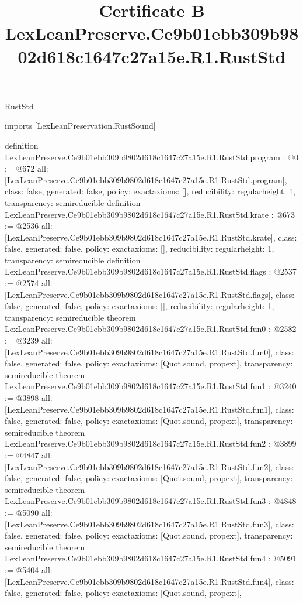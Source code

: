 \begin{lexlean}{RustStd}
\title{Certificate B LexLeanPreserve.Ce9b01ebb309b9802d618c1647c27a15e.R1.RustStd}
\begin{coremodule}
imports [LexLeanPreservation.RustSound]

definition LexLeanPreserve.Ce9b01ebb309b9802d618c1647c27a15e.R1.RustStd.program : @0 := @672 {
  all: [LexLeanPreserve.Ce9b01ebb309b9802d618c1647c27a15e.R1.RustStd.program],
  class: false,
  generated: false,
  policy: exact{axioms: []},
  reducibility: regular{height: 1},
  transparency: semireducible
}
definition LexLeanPreserve.Ce9b01ebb309b9802d618c1647c27a15e.R1.RustStd.krate : @673 := @2536 {
  all: [LexLeanPreserve.Ce9b01ebb309b9802d618c1647c27a15e.R1.RustStd.krate],
  class: false,
  generated: false,
  policy: exact{axioms: []},
  reducibility: regular{height: 1},
  transparency: semireducible
}
definition LexLeanPreserve.Ce9b01ebb309b9802d618c1647c27a15e.R1.RustStd.flags : @2537 := @2574 {
  all: [LexLeanPreserve.Ce9b01ebb309b9802d618c1647c27a15e.R1.RustStd.flags],
  class: false,
  generated: false,
  policy: exact{axioms: []},
  reducibility: regular{height: 1},
  transparency: semireducible
}
theorem LexLeanPreserve.Ce9b01ebb309b9802d618c1647c27a15e.R1.RustStd.fun0 : @2582 := @3239 {
  all: [LexLeanPreserve.Ce9b01ebb309b9802d618c1647c27a15e.R1.RustStd.fun0],
  class: false,
  generated: false,
  policy: exact{axioms: [Quot.sound, propext]},
  transparency: semireducible
}
theorem LexLeanPreserve.Ce9b01ebb309b9802d618c1647c27a15e.R1.RustStd.fun1 : @3240 := @3898 {
  all: [LexLeanPreserve.Ce9b01ebb309b9802d618c1647c27a15e.R1.RustStd.fun1],
  class: false,
  generated: false,
  policy: exact{axioms: [Quot.sound, propext]},
  transparency: semireducible
}
theorem LexLeanPreserve.Ce9b01ebb309b9802d618c1647c27a15e.R1.RustStd.fun2 : @3899 := @4847 {
  all: [LexLeanPreserve.Ce9b01ebb309b9802d618c1647c27a15e.R1.RustStd.fun2],
  class: false,
  generated: false,
  policy: exact{axioms: [Quot.sound, propext]},
  transparency: semireducible
}
theorem LexLeanPreserve.Ce9b01ebb309b9802d618c1647c27a15e.R1.RustStd.fun3 : @4848 := @5090 {
  all: [LexLeanPreserve.Ce9b01ebb309b9802d618c1647c27a15e.R1.RustStd.fun3],
  class: false,
  generated: false,
  policy: exact{axioms: [Quot.sound, propext]},
  transparency: semireducible
}
theorem LexLeanPreserve.Ce9b01ebb309b9802d618c1647c27a15e.R1.RustStd.fun4 : @5091 := @5404 {
  all: [LexLeanPreserve.Ce9b01ebb309b9802d618c1647c27a15e.R1.RustStd.fun4],
  class: false,
  generated: false,
  policy: exact{axioms: [Quot.sound, propext]},
}
\end{coremodule}
\end{lexlean}
